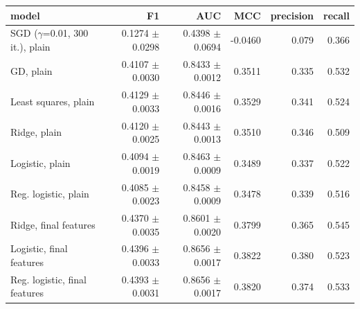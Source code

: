 \begin{tabular}{lrrrrr}
\toprule
model & F1 & AUC & MCC & precision & recall \\
\midrule
SGD ($\gamma$=0.01, 300 it.), plain & 0.1274 $\pm$ 0.0298 & 0.4398 $\pm$ 0.0694 & -0.0460 & 0.079 & 0.366 \\
GD, plain & 0.4107 $\pm$ 0.0030 & 0.8433 $\pm$ 0.0012 & 0.3511 & 0.335 & 0.532 \\
Least squares, plain & 0.4129 $\pm$ 0.0033 & 0.8446 $\pm$ 0.0016 & 0.3529 & 0.341 & 0.524 \\
Ridge, plain & 0.4120 $\pm$ 0.0025 & 0.8443 $\pm$ 0.0013 & 0.3510 & 0.346 & 0.509 \\
Logistic, plain & 0.4094 $\pm$ 0.0019 & 0.8463 $\pm$ 0.0009 & 0.3489 & 0.337 & 0.522 \\
Reg. logistic, plain & 0.4085 $\pm$ 0.0023 & 0.8458 $\pm$ 0.0009 & 0.3478 & 0.339 & 0.516 \\
Ridge, final features & 0.4370 $\pm$ 0.0035 & 0.8601 $\pm$ 0.0020 & 0.3799 & 0.365 & 0.545 \\
Logistic, final features & 0.4396 $\pm$ 0.0033 & 0.8656 $\pm$ 0.0017 & 0.3822 & 0.380 & 0.523 \\
Reg. logistic, final features & 0.4393 $\pm$ 0.0031 & 0.8656 $\pm$ 0.0017 & 0.3820 & 0.374 & 0.533 \\
\bottomrule
\end{tabular}
